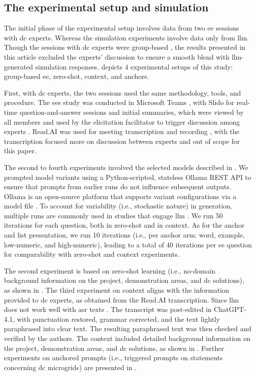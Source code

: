 \documentclass[manuscript,review,anonymous]{acmart}
\begin{document}
\subsection{The experimental setup and simulation}
The initial phase of the experimental setup involves data from two \gls{ee} sessions with \gls{dc} experts. Whereas the simulation experiments involve data only from \gls{llm}. Though the sessions with \gls{dc} experts were group-based \cite{anonymized2025_ShiftingCurrents}, the results presented in this article excluded the experts' discussion to ensure a smooth blend with \gls{llm}- generated simulation responses.
%
 depicts 4 experimental setups of this study: group-based \gls{ee}, zero-shot, context, and anchors.  

First, with \gls{dc} experts, the two sessions used the same methodology, tools, and procedure. The \glspl{ee} study was conducted in Microsoft Teams \cite{microsoftTeams}, with Slido for real-time question-and-answer sessions and initial summaries, which were viewed by all members and used by the elicitation facilitator to trigger discussion among experts \cite{slidoWebsite}. Read.AI was used for meeting transcription and recording \cite{readAI}, with the transcription focused more on discussion between experts and out of scope for this paper.

The second to fourth experiments involved the selected models described in . We prompted model variants using a Python-scripted, stateless Ollama REST API to ensure that prompts from earlier runs do not influence subsequent outputs. Ollama is an open-source platform that supports variant configurations via a model file \cite{Ollama}. To account for variability (i.e., stochastic nature) in generation, multiple runs are commonly used in studies that engage \gls{llm} \cite{azam2024multiple_runs, alampara2025multiple_runs}. We run 50 iterations for each question, both in zero-shot and in context. As for the anchor and list presentation, we run 10 iterations (i.e., per anchor arm: word, example, low-numeric, and high-numeric), leading to a total of 40 iterations per \gls{ee} question for comparability with zero-shot and context experiments. 
 
The second experiment is based on zero-shot learning (i.e., no-domain background information on the project, demonstration areas, and \gls{dc} solutions), as shown in . The third experiment on context aligns with the information provided to \gls{dc} experts, as obtained from the Read.AI transcription. Since \gls{llm} does not work well with \gls{asr} texts \cite{wang2024ASR, udagawa2024ASR}. The transcript was post-edited in ChatGPT-4.1, with punctuation restored, grammar corrected, and the text lightly paraphrased into clear text. The resulting paraphrased text was then checked and verified by the authors. The context included detailed background information on the project, demonstration areas, and \gls{dc} solutions, as shown in . 
Further experiments on anchored prompts (i.e., triggered prompts on statements concerning \gls{dc} microgrids) are presented in .    
 
\end{document}
